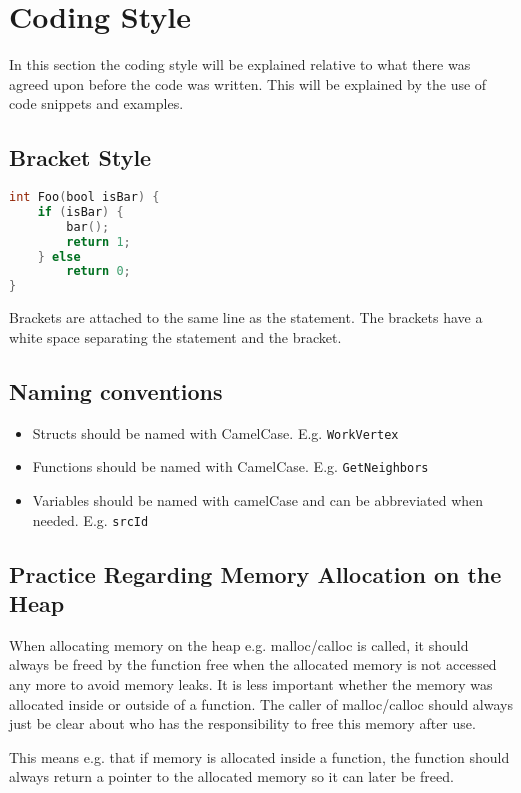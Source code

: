 \section{Coding Style}

In this section the coding style will be explained relative to what there was agreed upon before the code was written. This will be explained by the use of code snippets and examples.

\subsection{Bracket Style}

\begin{lstlisting}[style=customc, language=C]
int Foo(bool isBar) {
    if (isBar) {
        bar();
        return 1;
    } else
        return 0;
}
\end{lstlisting}

Brackets are attached to the same line as the statement. The brackets have a white space separating the statement and the bracket.

\subsection{Naming conventions}

\begin{itemize}
	\item Structs should be named with CamelCase. E.g. \texttt{WorkVertex}
	\item Functions should be named with CamelCase. E.g. \texttt{GetNeighbors}
	\item Variables should be named with camelCase and can be abbreviated when needed. E.g. \texttt{srcId}
\end{itemize}

\subsection{Practice Regarding Memory Allocation on the Heap}
When allocating memory on the heap e.g. malloc/calloc is called, it should always be freed by the function free when the allocated memory is not accessed any more to avoid memory leaks. It is less important whether the memory was allocated inside or outside of a function. The caller of malloc/calloc should always just be clear about who has the responsibility to free this memory after use. 

This means e.g. that if memory is allocated inside a function, the function should always return a pointer to the allocated memory so it can later be freed.